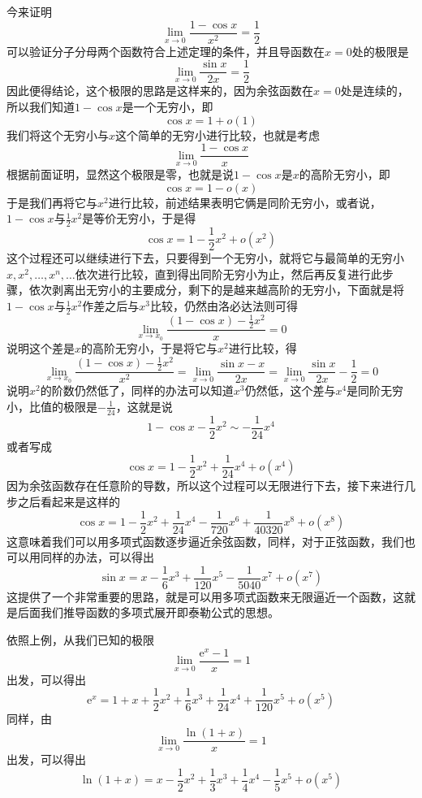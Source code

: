\begin{example}
  今来证明
  \[ \lim_{x \to 0} \frac{1-\cos{x}}{x^2} = \frac{1}{2} \]
  可以验证分子分母两个函数符合上述定理的条件，并且导函数在$x=0$处的极限是
  \[ \lim_{x \to 0} \frac{\sin{x}}{2x} = \frac{1}{2} \]
  因此便得结论，这个极限的思路是这样来的，因为余弦函数在$x=0$处是连续的，所以我们知道$1-\cos{x}$是一个无穷小，即
  \[ \cos{x} = 1+o(1) \]
  我们将这个无穷小与$x$这个简单的无穷小进行比较，也就是考虑
  \[ \lim_{x \to 0} \frac{1-\cos{x}}{x} \]
  根据前面证明，显然这个极限是零，也就是说$1-\cos{x}$是$x$的高阶无穷小，即
  \[ \cos{x} = 1-o(x) \]
  于是我们再将它与$x^2$进行比较，前述结果表明它俩是同阶无穷小，或者说，$1-\cos{x}$与$\frac{1}{2}x^2$是等价无穷小，于是得
  \[ \cos{x} = 1-\frac{1}{2}x^2 + o(x^2) \]
  这个过程还可以继续进行下去，只要得到一个无穷小，就将它与最简单的无穷小$x,x^2,\ldots,x^n,\ldots$依次进行比较，直到得出同阶无穷小为止，然后再反复进行此步骤，依次剥离出无穷小的主要成分，剩下的是越来越高阶的无穷小，下面就是将$1-\cos{x}$与$\frac{1}{2}x^2$作差之后与$x^3$比较，仍然由洛必达法则可得
  \[ \lim_{x \to x_0} \frac{(1-\cos{x})-\frac{1}{2}x^2}{x} = 0 \]
  说明这个差是$x$的高阶无穷小，于是将它与$x^2$进行比较，得
  \[ \lim_{x \to x_0} \frac{(1-\cos{x})-\frac{1}{2}x^2}{x^2} = \lim_{x \to 0} \frac{\sin{x}-x}{2x} = \lim_{x \to 0} \frac{\sin{x}}{2x} - \frac{1}{2} = 0 \]
  说明$x^2$的阶数仍然低了，同样的办法可以知道$x^3$仍然低，这个差与$x^4$是同阶无穷小，比值的极限是$-\frac{1}{24}$，这就是说
  \[ 1-\cos{x}-\frac{1}{2}x^2 \sim -\frac{1}{24}x^4 \]
  或者写成
  \[ \cos{x} = 1-\frac{1}{2}x^2+\frac{1}{24}x^4 + o(x^4) \]
  因为余弦函数存在任意阶的导数，所以这个过程可以无限进行下去，接下来进行几步之后看起来是这样的
  \[ \cos{x} = 1 - \frac{1}{2}x^2 + \frac{1}{24}x^4 - \frac{1}{720}x^6 + \frac{1}{40320}x^8 + o(x^8) \]
  这意味着我们可以用多项式函数逐步逼近余弦函数，同样，对于正弦函数，我们也可以用同样的办法，可以得出
  \[ \sin{x} = x - \frac{1}{6}x^3 + \frac{1}{120}x^5 - \frac{1}{5040}x^7 + o(x^7) \]
  这提供了一个非常重要的思路，就是可以用多项式函数来无限逼近一个函数，这就是后面我们推导函数的多项式展开即泰勒公式的思想。
\end{example}

\begin{example}
  依照上例，从我们已知的极限
  \[ \lim_{x \to 0} \frac{\mathrm{e}^x-1}{x} = 1 \]
  出发，可以得出
  \[ \mathrm{e}^x = 1 + x + \frac{1}{2}x^2+\frac{1}{6}x^3+\frac{1}{24}x^4+\frac{1}{120}x^5+o(x^5) \]
  同样，由
  \[ \lim_{x \to 0} \frac{\ln{(1+x)}}{x} = 1 \]
  出发，可以得出
  \[ \ln{(1+x)} = x - \frac{1}{2}x^2+\frac{1}{3}x^3+\frac{1}{4}x^4-\frac{1}{5}x^5+o(x^5) \]
\end{example}

